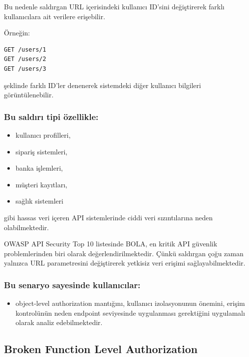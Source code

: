 Bu nedenle saldırgan URL içerisindeki kullanıcı ID’sini değiştirerek farklı kullanıcılara ait verilere erişebilir.

Örneğin:

\begin{verbatim}
GET /users/1
GET /users/2
GET /users/3
\end{verbatim}

şeklinde farklı ID’ler denenerek sistemdeki diğer kullanıcı bilgileri görüntülenebilir.

\subsubsection{Bu saldırı tipi özellikle:}

\begin{itemize}[leftmargin=*]
    \item kullanıcı profilleri,
    \item sipariş sistemleri,
    \item banka işlemleri,
    \item müşteri kayıtları,
    \item sağlık sistemleri
\end{itemize}

gibi hassas veri içeren API sistemlerinde ciddi veri sızıntılarına neden olabilmektedir.

OWASP API Security Top 10 listesinde BOLA, en kritik API güvenlik problemlerinden biri olarak değerlendirilmektedir. Çünkü saldırgan çoğu zaman yalnızca URL parametresini değiştirerek yetkisiz veri erişimi sağlayabilmektedir.

\subsubsection{Bu senaryo sayesinde kullanıcılar:}

\begin{itemize}[leftmargin=*]
    \item object-level authorization mantığını, kullanıcı izolasyonunun önemini, erişim kontrolünün neden endpoint seviyesinde uygulanması gerektiğini uygulamalı olarak analiz edebilmektedir.
\end{itemize}

\subsection{Broken Function Level Authorization}
\label{broken-function-level-authorization}

